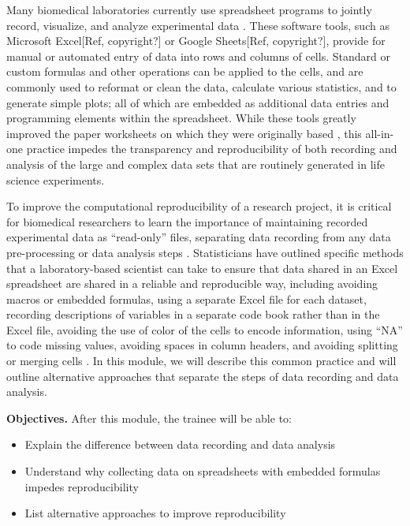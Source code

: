 \documentclass[]{tufte-book}
\providecommand{\tightlist}{%
  \setlength{\itemsep}{0pt}\setlength{\parskip}{0pt}}
\begin{document}
Many biomedical laboratories currently use spreadsheet programs to jointly
record, visualize, and analyze experimental data \citep{broman2018data}. These
software tools, such as Microsoft Excel{[}Ref, copyright?{]} or Google Sheets{[}Ref,
copyright?{]}, provide for manual or automated entry of data into rows and columns
of cells. Standard or custom formulas and other operations can be applied to the
cells, and are commonly used to reformat or clean the data, calculate various
statistics, and to generate simple plots; all of which are embedded as
additional data entries and programming elements within the spreadsheet. While
these tools greatly improved the paper worksheets on which they were originally
based \citep{campbell2007number}, this all-in-one practice impedes the transparency
and reproducibility of both recording and analysis of the large and complex data
sets that are routinely generated in life science experiments.

To improve the computational reproducibility of a research project, it is
critical for biomedical researchers to learn the importance of maintaining
recorded experimental data as ``read-only'' files, separating data recording from
any data pre-processing or data analysis steps \citep{broman2018data, marwick2018packaging}. Statisticians have outlined specific methods that a
laboratory-based scientist can take to ensure that data shared in an Excel
spreadsheet are shared in a reliable and reproducible way, including avoiding
macros or embedded formulas, using a separate Excel file for each dataset,
recording descriptions of variables in a separate code book rather than in the
Excel file, avoiding the use of color of the cells to encode information, using
``NA'' to code missing values, avoiding spaces in column headers, and avoiding
splitting or merging cells \citep{ellis2018share, broman2018data}. In this module,
we will describe this common practice and will outline alternative approaches
that separate the steps of data recording and data analysis.

\textbf{Objectives.} After this module, the trainee will be able to:

\begin{itemize}
\tightlist
\item
  Explain the difference between data recording and data analysis
\item
  Understand why collecting data on spreadsheets with embedded formulas impedes
  reproducibility
\item
  List alternative approaches to improve reproducibility
\end{itemize}
\end{document}
